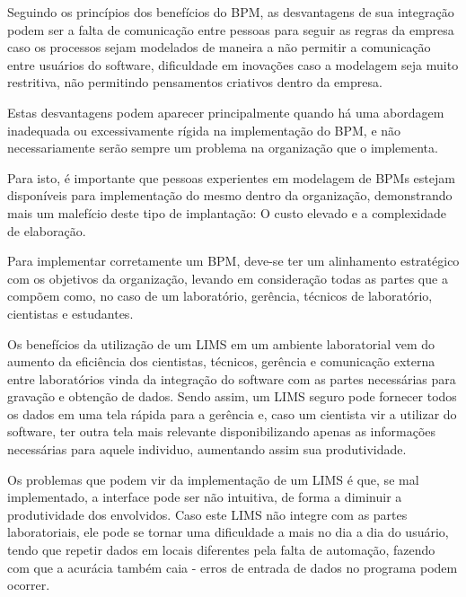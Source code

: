 Seguindo os princípios dos benefícios do BPM, as desvantagens de sua integração podem ser a falta de comunicação entre pessoas para seguir as regras da empresa caso os processos sejam modelados de maneira a não permitir a comunicação entre usuários do software, dificuldade em inovações caso a modelagem seja muito restritiva, não permitindo pensamentos criativos dentro da empresa.

Estas desvantagens podem aparecer principalmente quando há uma abordagem inadequada ou excessivamente rígida na implementação do BPM, e não necessariamente serão sempre um problema na organização que o implementa.

Para isto, é importante que pessoas experientes em modelagem de BPMs estejam disponíveis para implementação do mesmo dentro da organização, demonstrando mais um malefício deste tipo de implantação: O custo elevado e a complexidade de elaboração.

Para implementar corretamente um BPM, deve-se ter um alinhamento estratégico com os objetivos da organização, levando em consideração todas as partes que a compõem como, no caso de um laboratório, gerência, técnicos de laboratório, cientistas e estudantes.



Os benefícios da utilização de um LIMS em um ambiente laboratorial vem do aumento da eficiência dos cientistas, técnicos, gerência e comunicação externa entre laboratórios vinda da integração do software com as partes necessárias para gravação e obtenção de dados. Sendo assim, um LIMS seguro pode fornecer todos os dados em uma tela rápida para a gerência e, caso um cientista vir a utilizar do software, ter outra tela mais relevante disponibilizando apenas as informações necessárias para aquele individuo, aumentando assim sua produtividade.


Os problemas que podem vir da implementação de um LIMS é que, se mal implementado, a interface pode ser não intuitiva, de forma a diminuir a produtividade dos envolvidos. Caso este LIMS não integre com as partes laboratoriais, ele pode se tornar uma dificuldade a mais no dia a dia do usuário, tendo que repetir dados em locais diferentes pela falta de automação, fazendo com que a acurácia também caia - erros de entrada de dados no programa podem ocorrer.

